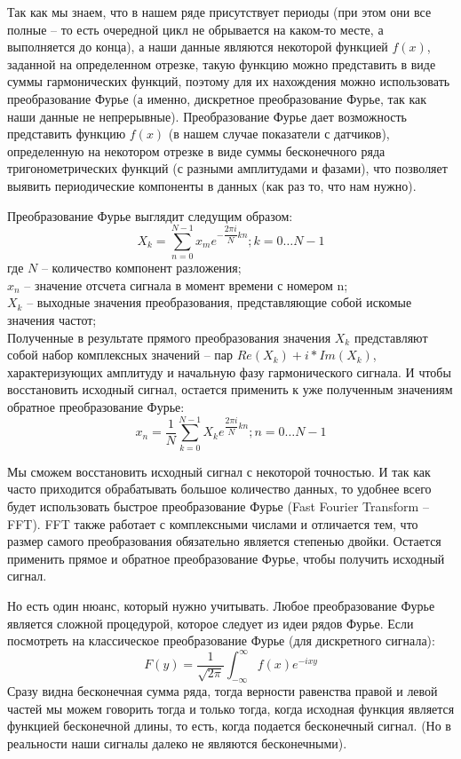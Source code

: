 Так как мы знаем, что в нашем ряде присутствует периоды (при этом они все полные – то есть очередной цикл не обрывается на каком-то месте, а выполняется до конца), а наши данные являются некоторой функцией $f(x)$, заданной на определенном отрезке, такую функцию можно представить в виде суммы гармонических функций, поэтому для их нахождения можно использовать преобразование Фурье (а именно, дискретное преобразование Фурье, так как наши данные не непрерывные). Преобразование Фурье
дает возможность представить функцию $f(x)$ (в нашем случае показатели с датчиков), определенную на некотором отрезке в виде суммы бесконечного ряда тригонометрических функций (с разными амплитудами и фазами), что позволяет выявить периодические компоненты в данных (как раз то, что нам нужно).

Преобразование Фурье выглядит следущим образом:
\[X_k = \sum_{n = 0}^{N - 1} x_m e^{- \dfrac{2 \pi i}{N} kn}; k = 0 \ldots N - 1\]
где $N$ -- количество компонент разложения; \\
$x_n$ -- значение отсчета сигнала в момент времени с номером n; \\
$X_k$ -- выходные значения преобразования, представляющие собой искомые значения частот; \\

Полученные в результате прямого преобразования значения $X_k$ представляют собой набор комплексных значений -- пар $Re(X_k) + i*Im(X_k)$, характеризующих амплитуду и начальную фазу гармонического сигнала. И чтобы восстановить исходный сигнал, остается применить к уже полученным значениям обратное преобразование Фурье:
\[x_n = \dfrac{1}{N} \sum_{k = 0}^{N-1} X_k e^{\dfrac{2 \pi i}{N} kn}; n = 0 \ldots N-1\]

Мы сможем восстановить исходный сигнал с некоторой точностью. И так как часто приходится обрабатывать большое количество данных, то удобнее всего будет использовать быстрое преобразование Фурье (Fast Fourier Transform -- FFT). FFT также работает с комплексными числами и отличается тем, что размер самого преобразования обязательно является степенью двойки. Остается применить прямое и обратное преобразование Фурье, чтобы получить исходный сигнал.

Но есть один нюанс, который нужно учитывать. Любое преобразование Фурье является сложной процедурой, которое следует из идеи рядов Фурье. Если посмотреть на классическое преобразование Фурье (для дискретного сигнала):
\[F(y) = \dfrac{1}{\sqrt{2 \pi}} \int_{- \infty}^{\infty} f(x) e^{-i x y}\]
Сразу видна бесконечная сумма ряда, тогда верности равенства правой и левой частей мы можем говорить тогда и только тогда, когда исходная функция является функцией бесконечной длины, то есть, когда подается бесконечный сигнал. (Но в реальности наши сигналы далеко не являются бесконечными). \\

